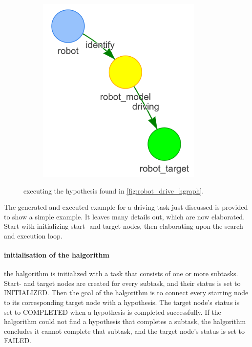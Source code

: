 \begin{figure}[h]
\begin{subfigure}{.3\textwidth}
    \end{subfigure}
    \begin{subfigure}{.3\textwidth}
    \centering
    \includegraphics[width=0.9\textwidth]{figures/proposed_method/connecting_nodes/robot_to_target/execute_robot_to_target_3}
    \end{subfigure}
    \caption{executing the hypothesis found in \cref{fig:robot_drive_hgraph}.}
    \label{fig:execute_robot_to_target}
\end{figure}

The generated and executed example for a driving task just discussed is provided to show a simple example. It leaves many details out, which are now elaborated. Start with initializing start- and target nodes, then elaborating upon the search- and execution loop.\bs

\paragraph{initialisation of the \ac{halgorithm}}
the \ac{halgorithm} is initialized with a task that consists of one or more subtasks. Start- and target nodes are created for every subtask, and their status is set to INITIALIZED. Then the goal of the \ac{halgorithm} is to connect every starting node to its corresponding target node with a hypothesis. The target node's status is set to COMPLETED when a hypothesis is completed successfully. If the \ac{halgorithm} could not find a hypothesis that completes a subtask, the \ac{halgorithm} concludes it cannot complete that subtask, and the target node's status is set to FAILED.\bs

